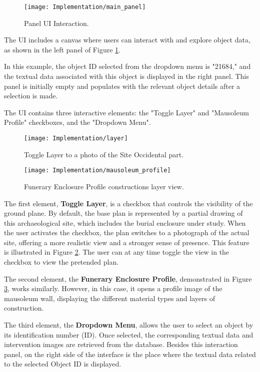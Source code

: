 \begin{figure}[h!]
    \centering
    \texttt{[image: Implementation/main\_panel]}
    \caption{Panel \gls{UI} Interaction.}
    \label{fig:main_panel}    
\end{figure}

The \gls{UI} includes a canvas where users can interact with and explore object data, as shown in the left panel of Figure \ref{fig:main_panel}. 

In this example, the object ID selected from the dropdown menu is "21684," and the textual data associated with this object is displayed in the right panel. 
This panel is initially empty and populates with the relevant object details after a selection is made. 

The \gls{UI} contains three interactive elements: the "Toggle Layer" and "Mausoleum Profile" checkboxes, and the "Dropdown Menu".

 \begin{figure}[h!]
    \centering
    \texttt{[image: Implementation/layer]}
    \caption{Toggle Layer to a photo of the Site Occidental part.}
    \label{fig:toggle_layer}    
\end{figure}


 \begin{figure}[h!]
    \centering
    \texttt{[image: Implementation/mausoleum\_profile]}
    \caption{Funerary Enclosure Profile constructions layer view.}
    \label{fig:mausoleum_profile}    
\end{figure}

The first element, \textbf{Toggle Layer}, is a checkbox that controls the visibility of the ground plane.
By default, the base plan is represented by a partial drawing of this archaeological site, which includes the burial enclosure under study. 
When the user activates the checkbox, the plan switches to a photograph of the actual site, offering a more realistic view and a stronger sense of presence. 
This feature is illustrated in Figure \ref{fig:toggle_layer}.
The user can at any time toggle the view in the checkbox to view the pretended plan.

The second element, the \textbf{Funerary Enclosure Profile}, demonstrated in Figure \ref{fig:mausoleum_profile}, works similarly. However, in this case, it opens a profile image of the mausoleum wall, displaying the different material types and layers of construction.

The third element, the \textbf{Dropdown Menu}, allows the user to select an object by its identification number (ID).
Once selected, the corresponding textual data and intervention images are retrieved from the database.
Besides this interaction panel, on the right side of the interface is the place where the textual data related to the selected Object ID is displayed.

